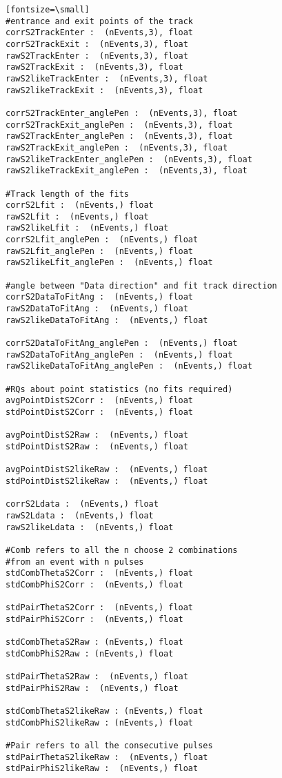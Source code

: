 \begin{verbatim}[fontsize=\small]
#entrance and exit points of the track
corrS2TrackEnter :  (nEvents,3), float 
corrS2TrackExit :  (nEvents,3), float 
rawS2TrackEnter :  (nEvents,3), float 
rawS2TrackExit :  (nEvents,3), float
rawS2likeTrackEnter :  (nEvents,3), float 
rawS2likeTrackExit :  (nEvents,3), float

corrS2TrackEnter_anglePen :  (nEvents,3), float 
corrS2TrackExit_anglePen :  (nEvents,3), float 
rawS2TrackEnter_anglePen :  (nEvents,3), float 
rawS2TrackExit_anglePen :  (nEvents,3), float
rawS2likeTrackEnter_anglePen :  (nEvents,3), float
rawS2likeTrackExit_anglePen :  (nEvents,3), float

#Track length of the fits
corrS2Lfit :  (nEvents,) float 
rawS2Lfit :  (nEvents,) float
rawS2likeLfit :  (nEvents,) float
corrS2Lfit_anglePen :  (nEvents,) float 
rawS2Lfit_anglePen :  (nEvents,) float
rawS2likeLfit_anglePen :  (nEvents,) float

#angle between "Data direction" and fit track direction
corrS2DataToFitAng :  (nEvents,) float 
rawS2DataToFitAng :  (nEvents,) float 
rawS2likeDataToFitAng :  (nEvents,) float 

corrS2DataToFitAng_anglePen :  (nEvents,) float 
rawS2DataToFitAng_anglePen :  (nEvents,) float 
rawS2likeDataToFitAng_anglePen :  (nEvents,) float 

#RQs about point statistics (no fits required)
avgPointDistS2Corr :  (nEvents,) float
stdPointDistS2Corr :  (nEvents,) float

avgPointDistS2Raw :  (nEvents,) float
stdPointDistS2Raw :  (nEvents,) float

avgPointDistS2likeRaw :  (nEvents,) float
stdPointDistS2likeRaw :  (nEvents,) float

corrS2Ldata :  (nEvents,) float 
rawS2Ldata :  (nEvents,) float
rawS2likeLdata :  (nEvents,) float

#Comb refers to all the n choose 2 combinations 
#from an event with n pulses
stdCombThetaS2Corr :  (nEvents,) float 
stdCombPhiS2Corr :  (nEvents,) float 

stdPairThetaS2Corr :  (nEvents,) float 
stdPairPhiS2Corr :  (nEvents,) float 

stdCombThetaS2Raw : (nEvents,) float
stdCombPhiS2Raw : (nEvents,) float

stdPairThetaS2Raw :  (nEvents,) float
stdPairPhiS2Raw :  (nEvents,) float

stdCombThetaS2likeRaw : (nEvents,) float
stdCombPhiS2likeRaw : (nEvents,) float

#Pair refers to all the consecutive pulses
stdPairThetaS2likeRaw :  (nEvents,) float
stdPairPhiS2likeRaw :  (nEvents,) float


\end{verbatim}
